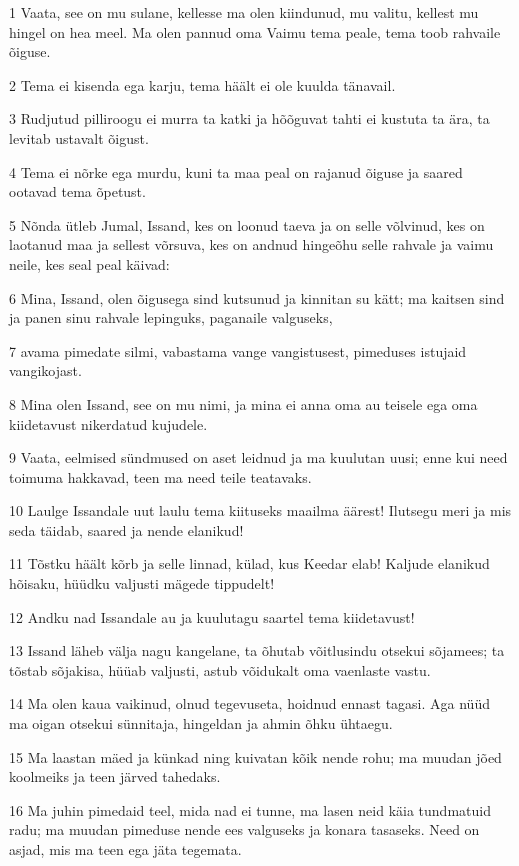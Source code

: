 \par 1 Vaata, see on mu sulane, kellesse ma olen kiindunud, mu valitu, kellest mu hingel on hea meel. Ma olen pannud oma Vaimu tema peale, tema toob rahvaile õiguse.
\par 2 Tema ei kisenda ega karju, tema häält ei ole kuulda tänavail.
\par 3 Rudjutud pilliroogu ei murra ta katki ja hõõguvat tahti ei kustuta ta ära, ta levitab ustavalt õigust.
\par 4 Tema ei nõrke ega murdu, kuni ta maa peal on rajanud õiguse ja saared ootavad tema õpetust.
\par 5 Nõnda ütleb Jumal, Issand, kes on loonud taeva ja on selle võlvinud, kes on laotanud maa ja sellest võrsuva, kes on andnud hingeõhu selle rahvale ja vaimu neile, kes seal peal käivad:
\par 6 Mina, Issand, olen õigusega sind kutsunud ja kinnitan su kätt; ma kaitsen sind ja panen sinu rahvale lepinguks, paganaile valguseks,
\par 7 avama pimedate silmi, vabastama vange vangistusest, pimeduses istujaid vangikojast.
\par 8 Mina olen Issand, see on mu nimi, ja mina ei anna oma au teisele ega oma kiidetavust nikerdatud kujudele.
\par 9 Vaata, eelmised sündmused on aset leidnud ja ma kuulutan uusi; enne kui need toimuma hakkavad, teen ma need teile teatavaks.
\par 10 Laulge Issandale uut laulu tema kiituseks maailma äärest! Ilutsegu meri ja mis seda täidab, saared ja nende elanikud!
\par 11 Tõstku häält kõrb ja selle linnad, külad, kus Keedar elab! Kaljude elanikud hõisaku, hüüdku valjusti mägede tippudelt!
\par 12 Andku nad Issandale au ja kuulutagu saartel tema kiidetavust!
\par 13 Issand läheb välja nagu kangelane, ta õhutab võitlusindu otsekui sõjamees; ta tõstab sõjakisa, hüüab valjusti, astub võidukalt oma vaenlaste vastu.
\par 14 Ma olen kaua vaikinud, olnud tegevuseta, hoidnud ennast tagasi. Aga nüüd ma oigan otsekui sünnitaja, hingeldan ja ahmin õhku ühtaegu.
\par 15 Ma laastan mäed ja künkad ning kuivatan kõik nende rohu; ma muudan jõed koolmeiks ja teen järved tahedaks.
\par 16 Ma juhin pimedaid teel, mida nad ei tunne, ma lasen neid käia tundmatuid radu; ma muudan pimeduse nende ees valguseks ja konara tasaseks. Need on asjad, mis ma teen ega jäta tegemata.
